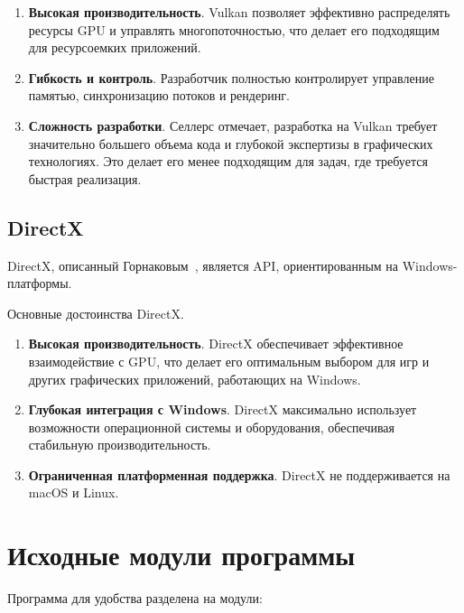\begin{enumerate}[label=\arabic*), labelsep=0.5em]
    \item \textbf{Высокая производительность}.
    Vulkan позволяет эффективно распределять ресурсы GPU и управлять многопоточностью,
    что делает его подходящим для ресурсоемких приложений.
    \item \textbf{Гибкость и контроль}.
    Разработчик полностью контролирует управление памятью,
    синхронизацию потоков и рендеринг.
    \item \textbf{Сложность разработки}.
    Селлерс отмечает, разработка на Vulkan требует значительно большего объема кода и
    глубокой экспертизы в графических технологиях. Это делает его менее подходящим для задач,
    где требуется быстрая реализация.
\end{enumerate}

\subsection{DirectX}

DirectX, описанный Горнаковым~\cite{DirectX_with_OpenGL},
является API, ориентированным на Windows-платформы.

Основные достоинства DirectX.

\begin{enumerate}[label=\arabic*), labelsep=0.5em]
    \item \textbf{Высокая производительность}.
    DirectX обеспечивает эффективное взаимодействие с GPU,
    что делает его оптимальным выбором для игр и других графических приложений,
    работающих на Windows.
    \item \textbf{Глубокая интеграция с Windows}.
    DirectX максимально использует возможности операционной системы и оборудования,
    обеспечивая стабильную производительность.
    \item \textbf{Ограниченная платформенная поддержка}.
    DirectX не поддерживается на macOS и Linux.
\end{enumerate}

\section{Исходные модули программы}

Программа для удобства разделена на модули:

